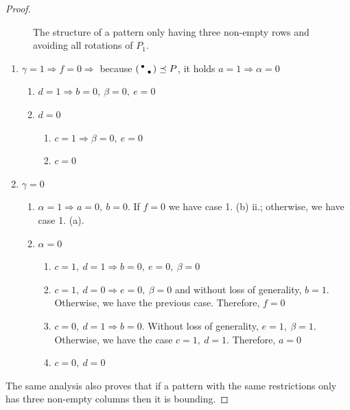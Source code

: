 \begin{proof}
\begin{figure}[!ht]
	\caption{The structure of a pattern only having three non-empty rows and avoiding all rotations of $P_1$.}
	\label{fig:threelines}
\end{figure}
\begin{enumerate}
	\item $\gamma=1\Rightarrow f=0\Rightarrow$ because $\left(\begin{smallmatrix}\bullet& \\ &\bullet\end{smallmatrix}\right)\preceq P$, it holds $a=1\Rightarrow\alpha=0$
		\begin{enumerate}
			\item $d=1\Rightarrow b=0,\ \beta=0,\ e=0$
			\item $d=0$
				\begin{enumerate}
					\item $c=1\Rightarrow\beta=0,\ e=0$
					\item $c=0$
				\end{enumerate}
		\end{enumerate}
	\item $\gamma=0$
		\begin{enumerate}
			\item $\alpha=1\Rightarrow a=0,\ b=0$. If $f=0$ we have case 1. (b) ii.; otherwise, we have case 1. (a).
			\item $\alpha=0$
				\begin{enumerate}
					\item $c=1,\ d=1\Rightarrow b=0,\ e=0,\ \beta=0$
					\item $c=1,\ d=0\Rightarrow e=0,\ \beta=0$ and without loss of generality, $b=1$. Otherwise, we have the previous case. Therefore, $f=0$
					\item $c=0,\ d=1\Rightarrow b=0$. Without loss of generality, $e=1,\ \beta=1$. Otherwise, we have the case $c=1,\ d=1$. Therefore, $a=0$
					\item $c=0,\ d=0$
				\end{enumerate}
		\end{enumerate}
\end{enumerate}
The same analysis also proves that if a pattern with the same restrictions only has three non-empty columns then it is bounding.


\end{proof}

